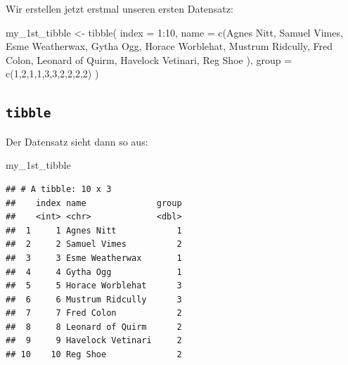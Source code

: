 \documentclass[
]{book}
\newenvironment{Shaded}{\begin{snugshade}}{\end{snugshade}}
\newcommand{\AttributeTok}[1]{\textcolor[rgb]{0.77,0.63,0.00}{#1}}
\newcommand{\DecValTok}[1]{\textcolor[rgb]{0.00,0.00,0.81}{#1}}
\newcommand{\FunctionTok}[1]{\textcolor[rgb]{0.00,0.00,0.00}{#1}}
\newcommand{\NormalTok}[1]{#1}
\newcommand{\OtherTok}[1]{\textcolor[rgb]{0.56,0.35,0.01}{#1}}
\newcommand{\SpecialCharTok}[1]{\textcolor[rgb]{0.00,0.00,0.00}{#1}}
\newcommand{\StringTok}[1]{\textcolor[rgb]{0.31,0.60,0.02}{#1}}
\begin{document}
Wir erstellen jetzt erstmal unseren ersten Datensatz:

\begin{Shaded}
\begin{Highlighting}[]
\NormalTok{my\_1st\_tibble }\OtherTok{\textless{}{-}} \FunctionTok{tibble}\NormalTok{(}
  \AttributeTok{index =} \DecValTok{1}\SpecialCharTok{:}\DecValTok{10}\NormalTok{,}
  \AttributeTok{name =} \FunctionTok{c}\NormalTok{(}\StringTok{\textquotesingle{}Agnes Nitt\textquotesingle{}}\NormalTok{,}
           \StringTok{\textquotesingle{}Samuel Vimes\textquotesingle{}}\NormalTok{,}
           \StringTok{\textquotesingle{}Esme Weatherwax\textquotesingle{}}\NormalTok{,}
           \StringTok{\textquotesingle{}Gytha Ogg\textquotesingle{}}\NormalTok{,}
           \StringTok{\textquotesingle{}Horace Worblehat\textquotesingle{}}\NormalTok{,}
           \StringTok{\textquotesingle{}Mustrum Ridcully\textquotesingle{}}\NormalTok{,}
           \StringTok{\textquotesingle{}Fred Colon\textquotesingle{}}\NormalTok{,}
           \StringTok{\textquotesingle{}Leonard of Quirm\textquotesingle{}}\NormalTok{,}
           \StringTok{\textquotesingle{}Havelock Vetinari\textquotesingle{}}\NormalTok{,}
           \StringTok{\textquotesingle{}Reg Shoe\textquotesingle{}}
\NormalTok{  ),}
  \AttributeTok{group =} \FunctionTok{c}\NormalTok{(}\DecValTok{1}\NormalTok{,}\DecValTok{2}\NormalTok{,}\DecValTok{1}\NormalTok{,}\DecValTok{1}\NormalTok{,}\DecValTok{3}\NormalTok{,}\DecValTok{3}\NormalTok{,}\DecValTok{2}\NormalTok{,}\DecValTok{2}\NormalTok{,}\DecValTok{2}\NormalTok{,}\DecValTok{2}\NormalTok{)}
\NormalTok{)}
\end{Highlighting}
\end{Shaded}

\hypertarget{tibble}{%
\subsection{\texorpdfstring{\texttt{tibble}}{tibble}}\label{tibble}}

Der Datensatz sieht dann so aus:

\begin{Shaded}
\begin{Highlighting}[]
\NormalTok{my\_1st\_tibble}
\end{Highlighting}
\end{Shaded}

\begin{verbatim}
## # A tibble: 10 x 3
##    index name              group
##    <int> <chr>             <dbl>
##  1     1 Agnes Nitt            1
##  2     2 Samuel Vimes          2
##  3     3 Esme Weatherwax       1
##  4     4 Gytha Ogg             1
##  5     5 Horace Worblehat      3
##  6     6 Mustrum Ridcully      3
##  7     7 Fred Colon            2
##  8     8 Leonard of Quirm      2
##  9     9 Havelock Vetinari     2
## 10    10 Reg Shoe              2
\end{verbatim}
\end{document}
